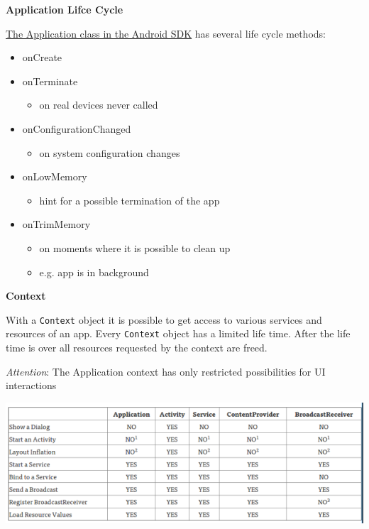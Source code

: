 \documentclass[11pt,twoside,landscape]{article}
\begin{document}
\begin{multicols}{3}
\textbf{Application Lifce Cycle}

\href{../../../roam/20211103155952-the_application_class_in_the_android_sdk.org}{The Application class in the Android SDK} has several life cycle methods:

\begin{itemize}
\item onCreate
\item onTerminate
\begin{itemize}
\item on real devices never called
\end{itemize}
\item onConfigurationChanged
\begin{itemize}
\item on system configuration changes
\end{itemize}
\item onLowMemory
\begin{itemize}
\item hint for a possible termination of the app
\end{itemize}
\item onTrimMemory
\begin{itemize}
\item on moments where it is possible to clean up
\item e.g. app is in background
\end{itemize}
\end{itemize}


\textbf{Context}

With a \texttt{Context} object it is possible to get access to various services and resources of an app.
Every \texttt{Context} object has a limited life time.
After the life time is over all resources requested by the context are freed. 


\emph{Attention}: The Application context has only restricted possibilities for UI interactions 
\begin{center}
\includegraphics[width=.9\linewidth]{img/context_and_their_possibilities.png}
\end{center}



\end{multicols}
\end{document}
